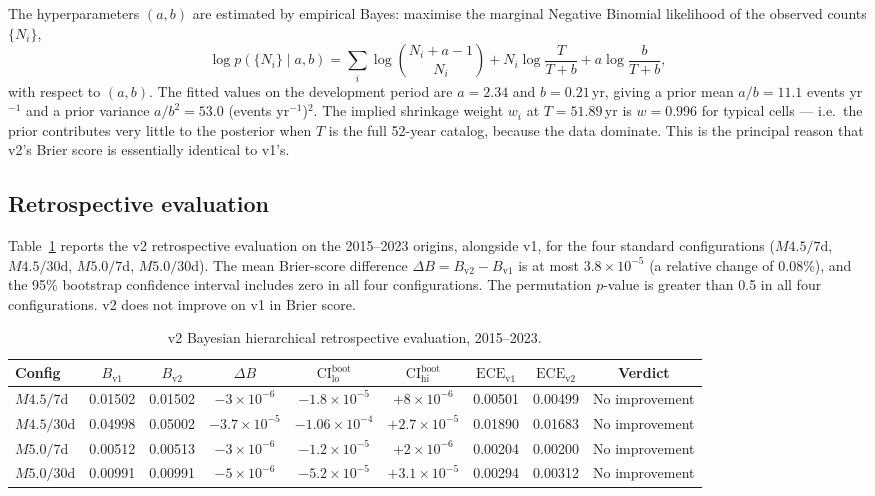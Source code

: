 \documentclass[10pt,a4paper,twocolumn]{article}
\begin{document}
The hyperparameters $(a,b)$ are estimated by empirical Bayes: maximise the marginal Negative Binomial likelihood of the observed counts $\{N_i\}$,
\[
\log p(\{N_i\} \mid a, b) = \sum_i \log \binom{N_i + a - 1}{N_i} + N_i \log\frac{T}{T + b} + a \log\frac{b}{T + b},
\]
with respect to $(a,b)$. The fitted values on the development period are $a=2.34$ and $b=0.21$\,yr, giving a prior mean $a/b = 11.1$ events yr$^{-1}$ and a prior variance $a/b^2 = 53.0$ (events yr$^{-1}$)$^2$. The implied shrinkage weight $w_i$ at $T=51.89$\,yr is $w=0.996$ for typical cells --- i.e.\ the prior contributes very little to the posterior when $T$ is the full 52-year catalog, because the data dominate. This is the principal reason that v2's Brier score is essentially identical to v1's.

\subsection{Retrospective evaluation}

Table~\ref{tab:v2-results} reports the v2 retrospective evaluation on the 2015--2023 origins, alongside v1, for the four standard configurations ($M4.5/7$d, $M4.5/30$d, $M5.0/7$d, $M5.0/30$d). The mean Brier-score difference $\Delta B = B_{\text{v2}} - B_{\text{v1}}$ is at most $3.8\times10^{-5}$ (a relative change of 0.08\%), and the 95\% bootstrap confidence interval includes zero in all four configurations. The permutation $p$-value is greater than 0.5 in all four configurations. v2 does not improve on v1 in Brier score.

\begin{table}[t]
\centering
\caption{v2 Bayesian hierarchical retrospective evaluation, 2015--2023.}\label{tab:v2-results}
\small
\begin{tabular*}{\textwidth}{@{\extracolsep{\fill}}lcccccccc}
\toprule
Config & $B_{\text{v1}}$ & $B_{\text{v2}}$ & $\Delta B$ & $\text{CI}^{\text{boot}}_{\text{lo}}$ & $\text{CI}^{\text{boot}}_{\text{hi}}$ & $\text{ECE}_{\text{v1}}$ & $\text{ECE}_{\text{v2}}$ & Verdict \\
\midrule
$M4.5/7$d  & 0.01502 & 0.01502 & $-3\times10^{-6}$ & $-1.8\times10^{-5}$ & $+8\times10^{-6}$ & 0.00501 & 0.00499 & No improvement \\
$M4.5/30$d & 0.04998 & 0.05002 & $-3.7\times10^{-5}$ & $-1.06\times10^{-4}$ & $+2.7\times10^{-5}$ & 0.01890 & 0.01683 & No improvement \\
$M5.0/7$d  & 0.00512 & 0.00513 & $-3\times10^{-6}$ & $-1.2\times10^{-5}$ & $+2\times10^{-6}$ & 0.00204 & 0.00200 & No improvement \\
$M5.0/30$d & 0.00991 & 0.00991 & $-5\times10^{-6}$ & $-5.2\times10^{-5}$ & $+3.1\times10^{-5}$ & 0.00294 & 0.00312 & No improvement \\
\bottomrule
\end{tabular*}
\end{table}
\end{document}
